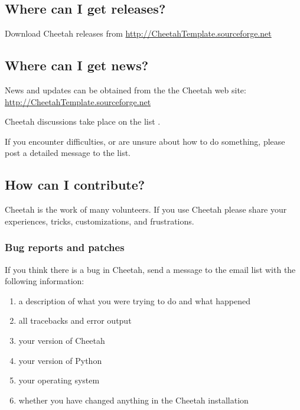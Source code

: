 \subsection{Where can I get releases?}
\label{intro.releases}

Download Cheetah releases from
\url{http://CheetahTemplate.sourceforge.net}

\subsection{Where can I get news?}
\label{intro.news}

News and updates can be obtained from the the Cheetah web site:
\url{http://CheetahTemplate.sourceforge.net}

Cheetah discussions take place on the list
.

If you encounter difficulties, or are unsure about how to do something,
please post a detailed message to the list.

\subsection{How can I contribute?}
\label{intro.contribute}

Cheetah is the work of many volunteers.  If you use Cheetah please share your
experiences, tricks, customizations, and frustrations.

\subsubsection{Bug reports and patches}

If you think there is a bug in Cheetah, send a message to the email list
with the following information:

\begin{enumerate}
\item a description of what you were trying to do and what happened
\item all tracebacks and error output
\item your version of Cheetah
\item your version of Python
\item your operating system
\item whether you have changed anything in the Cheetah installation
\end{enumerate}

